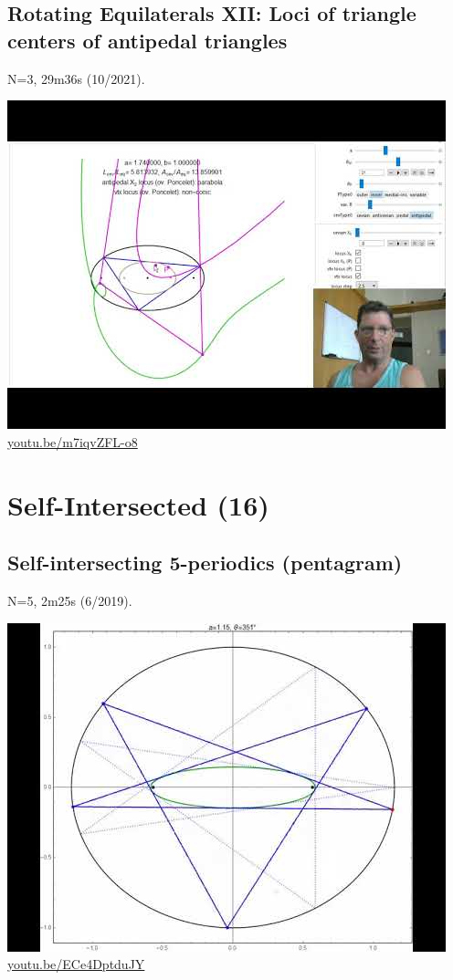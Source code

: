 \documentclass[12pt]{amsart}
\begin{document}
\subsection{Rotating Equilaterals XII: Loci of triangle centers of antipedal triangles}
\label{vid:m7iqvZFL-o8}
\noindent N=3, 29m36s (10/2021). 
\begin{center}\includegraphics[width=.5\textwidth]{pics/m7iqvZFL-o8.jpg} \\ 
\href{https://youtu.be/m7iqvZFL-o8}{\url{youtu.be/m7iqvZFL-o8}}\end{center}
% 

\section{Self-Intersected (16)}

\subsection{Self-intersecting 5-periodics (pentagram)}
\label{vid:ECe4DptduJY}
\noindent N=5, 2m25s (6/2019). 
\begin{center}\includegraphics[width=.5\textwidth]{pics/ECe4DptduJY.jpg} \\ 
\href{https://youtu.be/ECe4DptduJY}{\url{youtu.be/ECe4DptduJY}}\end{center}
% 
\end{document}
